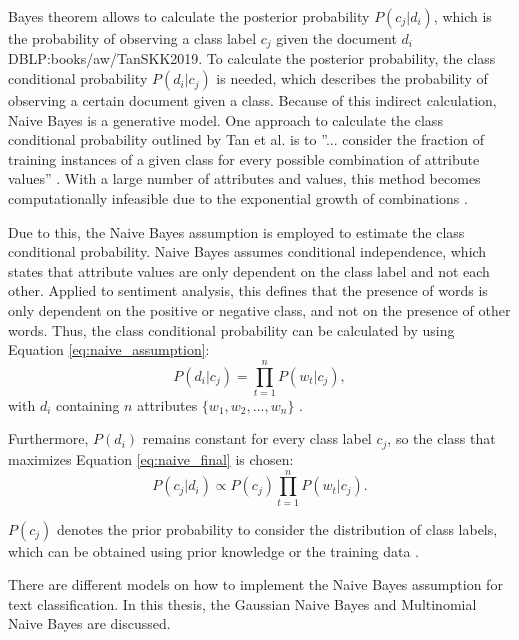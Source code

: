         Bayes theorem allows to calculate the posterior probability $P(c_j|d_i)$, which is the probability of observing a class label $c_j$ given the document $d_i$ {DBLP:books/aw/TanSKK2019}. To calculate the posterior probability, the class conditional probability $P(d_i|c_j)$ is needed, which describes the probability of observing a certain document given a class. Because of this indirect calculation, Naive Bayes is a generative model. One approach to calculate the class conditional probability outlined by Tan et al. is to ''... consider the fraction of training instances of a given class for every possible combination of attribute values'' \cite[p.~419]{DBLP:books/aw/TanSKK2019}. With a large number of attributes and values, this method becomes computationally infeasible due to the exponential growth of combinations \cite{DBLP:books/aw/TanSKK2019}.

        Due to this, the Naive Bayes assumption is employed to estimate the class conditional probability. Naive Bayes assumes conditional independence, which states that attribute values are only dependent on the class label and not each other. Applied to sentiment analysis, this defines that the presence of words is only dependent on the positive or negative class, and not on the presence of other words. Thus, the class conditional probability can be calculated by using Equation \eqref{eq:naive_assumption}:
        \begin{equation}
            \label{eq:naive_assumption}
            P(d_i|c_j) = \prod_{t=1}^{n}P(w_{t}|c_j),
        \end{equation}
        with $d_i$ containing $n$ attributes $\{w_1,w_2,...,w_n\}$ \cite{DBLP:books/aw/TanSKK2019}.

        Furthermore, $P(d_i)$ remains constant for every class label $c_j$, so the class that maximizes Equation \eqref{eq:naive_final} is chosen: 
        \begin{equation}
            \label{eq:naive_final}
            P(c_j|d_i)\propto P(c_j)\prod_{t=1}^{n}P(w_{t}|c_j) .
        \end{equation}   
        
        $P(c_j)$ denotes the prior probability to consider the distribution of class labels, which can be obtained using prior knowledge or the training data \cite{DBLP:books/aw/TanSKK2019}.
        
        There are different models on how to implement the Naive Bayes assumption for text classification. In this thesis, the Gaussian Naive Bayes and Multinomial Naive Bayes are discussed. 
        
